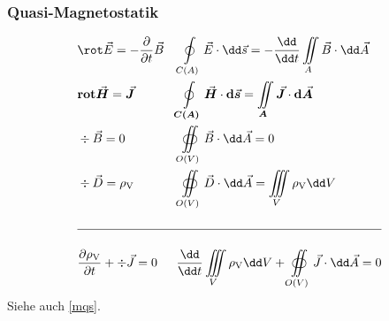 	  \subsubsection{Quasi-Magnetostatik}
		  \begin{align}
			   & \rot \vec{E}= -\dfrac{\partial}{\partial t}\vec{B}          &  & \oint\limits_{C(A)}\vec{E}\cdot \dd\vec{s}= -\dfrac{\dd}{\dd t}\iint\limits_{A}\vec{B}\cdot \dd\vec{A}                                  \\
			   & {\textbf{rot} \vec{\bm{H}} = \vec{\bm{J}}}                  &  & {\oint\limits_{\bm{C(A)}} \vec{\bm{H}} \cdot \textbf{d}\vec{\bm{s}} = \iint\limits_{\bm{A}} \vec{\bm{J}} \cdot \textbf{d}\vec{\bm{A}} } \\
			   & \div \vec{B}= 0                                             &  & \oiint\limits_{O(V)}\vec{B}\cdot \dd\vec{A}= 0                                                                                          \\
			   & \div \vec{D}= \rho_{\text{V}}                               &  & \oiint\limits_{O(V)}\vec{D}\cdot \dd\vec{A}= \iiint\limits_{V}\rho_{\text{V}}\dd V                                                      \\
			  \nonumber                                                                                                                                                                                                   \\
			  \hline
			  \nonumber                                                                                                                                                                                                   \\
			   & \dfrac{\partial \rho_\text{V}}{\partial t}+ \div \vec{J}= 0 &  & \dfrac{\dd}{\dd t}\iiint\limits_{V}\rho_{\text{V}}\dd V + \oiint\limits_{O(V)}\vec{J}\cdot \dd\vec{A}= 0
		  \end{align}
		  Siehe auch \ref{mqs}.
